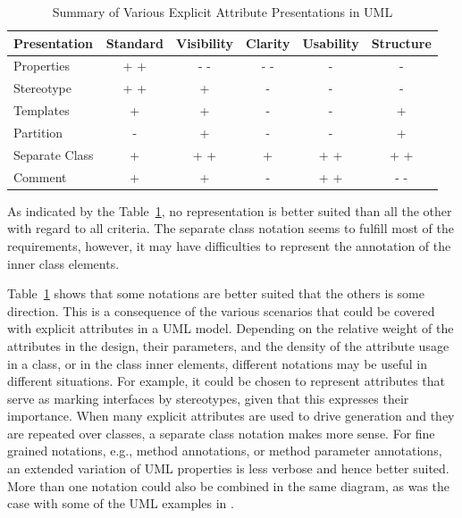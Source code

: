 \begin{table}[ht]
	\begin{center}
		\begin{tabular}{|l||c|c|c|c|c|}
		\rowcolor[gray]{.7}
\hline
 Presentation &   Standard & Visibility &  Clarity &      Usability &  Structure \\

\hline
Properties &      + +      &      - -      &      - -      &      -      &      -      \\
\hline
Stereotype &       + +     &       +     &      -      &      -      &       -     \\
\hline
 Templates &       +     &       +     &       -     &       -     &      +      \\
\hline
 Partition &        -    &       +     &       -     &        -    &       +     \\
\hline
Separate Class &     +       &     + +       &     +       &     + +       &     + +       \\
\hline
   Comment &       +     &      +      &     -       &      + +      &      - -      \\
\hline
		\end{tabular}
	\end{center}

	\caption{Summary of Various Explicit Attribute Presentations in UML}
	\label{tab:AttributePresentationInUML}
\end{table}

As indicated by the Table~\ref{tab:AttributePresentationInUML}, no representation is better suited than all the other with regard to all criteria. The separate class notation seems to fulfill most of the requirements, however, it may have difficulties to represent the annotation of the inner class elements.

Table~\ref{tab:AttributePresentationInUML} shows that some notations are better suited that the others is some direction. This is a consequence of the various scenarios that could be covered with explicit attributes in a UML model. Depending on the
relative weight of the attributes in the design, their parameters, and the density of the attribute usage in a class, or in the class inner elements, different notations may be useful in different situations. 
%
For example, it could be chosen to represent attributes that serve as marking interfaces \cite{design.attrib} by stereotypes, given that this expresses their importance. When many explicit attributes are used to drive generation and they are repeated over classes, a separate class notation makes more sense. For fine grained notations, e.g., method annotations, or method parameter annotations, an extended variation of UML properties is less verbose and hence better suited. More than one notation could also be combined in the same diagram, as was the case with some of the UML examples in .

